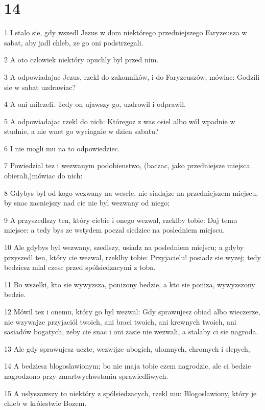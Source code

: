 \chapter{14}

\par 1 I stalo sie, gdy wszedl Jezus w dom niektórego przedniejszego Faryzeusza w sabat, aby jadl chleb, ze go oni podstrzegali.
\par 2 A oto czlowiek niektóry opuchly byl przed nim.
\par 3 A odpowiadajac Jezus, rzekl do zakonników, i do Faryzeuszów, mówiac: Godzili sie w sabat uzdrawiac?
\par 4 A oni milczeli. Tedy on ujawszy go, uzdrowil i odprawil.
\par 5 A odpowiadajac rzekl do nich: Któregoz z was osiel albo wól wpadnie w studnie, a nie wnet go wyciagnie w dzien sabatu?
\par 6 I nie mogli mu na to odpowiedziec.
\par 7 Powiedzial tez i wezwanym podobienstwo, (baczac, jako przedniejsze miejsca obierali,)mówiac do nich:
\par 8 Gdybys byl od kogo wezwany na wesele, nie siadajze na przedniejszem miejscu, by snac zacniejszy nad cie nie byl wezwany od niego;
\par 9 A przyszedlszy ten, który ciebie i onego wezwal, rzeklby tobie: Daj temu miejsce: a tedy bys ze wstydem poczal siedziec na posledniem miejscu.
\par 10 Ale gdybys byl wezwany, szedlszy, usiadz na posledniem miejscu; a gdyby przyszedl ten, który cie wezwal, rzeklby tobie: Przyjacielu! posiadz sie wyzej; tedy bedziesz mial czesc przed spólsiedzacymi z toba.
\par 11 Bo wszelki, kto sie wywyzsza, ponizony bedzie, a kto sie poniza, wywyzszony bedzie.
\par 12 Mówil tez i onemu, który go byl wezwal: Gdy sprawujesz obiad albo wieczerze, nie wzywajze przyjaciól twoich, ani braci twoich, ani krewnych twoich, ani sasiadów bogatych, zeby cie snac i oni zasie nie wezwali, a stalaby ci sie nagroda.
\par 13 Ale gdy sprawujesz uczte, wezwijze ubogich, ulomnych, chromych i slepych,
\par 14 A bedziesz blogoslawionym; bo nie maja tobie czem nagrodzic, ale ci bedzie nagrodzono przy zmartwychwstaniu sprawiedliwych.
\par 15 A uslyszawszy to niektóry z spólsiedzacych, rzekl mu: Blogoslawiony, który je chleb w królestwie Bozem.
